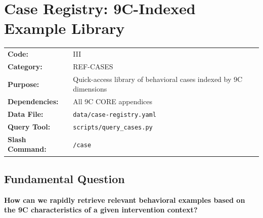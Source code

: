 
\chapter{Case Registry: 9C-Indexed Example Library}
\label{app:cases}

\begin{tcolorbox}[colback=gray!5, colframe=gray!50, title=Appendix Metadata]
\begin{tabular}{ll}
\textbf{Code:} & III \\
\textbf{Category:} & REF-CASES \\
\textbf{Purpose:} & Quick-access library of behavioral cases indexed by 9C dimensions \\
\textbf{Dependencies:} & All 9C CORE appendices \\
\textbf{Data File:} & \texttt{data/case-registry.yaml} \\
\textbf{Query Tool:} & \texttt{scripts/query\_cases.py} \\
\textbf{Slash Command:} & \texttt{/case} \\
\end{tabular}
\end{tcolorbox}

\section{Fundamental Question}

\begin{tcolorbox}[colback=blue!5, colframe=blue!50, title=Central Question]
\textbf{How can we rapidly retrieve relevant behavioral examples based on the 9C characteristics of a given intervention context?}
\end{tcolorbox}

